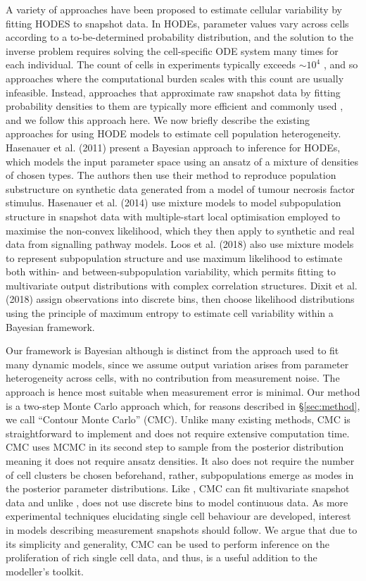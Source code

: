 A variety of approaches have been proposed to estimate cellular variability by fitting HODES to snapshot data. In HODEs, parameter values vary across cells according to a to-be-determined probability distribution, and the solution to the inverse problem requires solving the cell-specific ODE system many times for each individual. The count of cells in experiments typically exceeds $\sim10^4$ \cite{hasenauer2011identification}, and so approaches where the computational burden scales with this count are usually infeasible. Instead, approaches that approximate raw snapshot data by fitting probability densities to them are typically more efficient and commonly used \cite{hasenauer2011identification,hasenauer2014ode,loos2018hierarchical,dixit2018maximum}, and we follow this approach here. We now briefly describe the existing approaches for using HODE models to estimate cell population heterogeneity. Hasenauer et al. (2011) present a Bayesian approach to inference for HODEs, which models the input parameter space using an ansatz of a mixture of densities of chosen types. The authors then use their method to reproduce population substructure on synthetic data generated from a model of tumour necrosis factor stimulus. Hasenauer et al. (2014) use mixture models to model subpopulation structure in snapshot data with multiple-start local optimisation employed to maximise the non-convex likelihood, which they then apply to synthetic and real data from signalling pathway models. Loos et al. (2018) also use mixture models to represent subpopulation structure and use maximum likelihood to estimate both within- and between-subpopulation variability, which permits fitting to multivariate output distributions with complex correlation structures. Dixit et al. (2018) assign observations into discrete bins, then choose likelihood distributions using the principle of maximum entropy to estimate cell variability within a Bayesian framework.

Our framework is Bayesian although is distinct from the approach used to fit many dynamic models, since we assume output variation arises from parameter heterogeneity across cells, with no contribution from measurement noise. The approach is hence most suitable when measurement error is minimal. Our method is a two-step Monte Carlo approach which, for reasons described in \S \ref{sec:method}, we call ``Contour Monte Carlo'' (CMC). Unlike many existing methods, CMC is straightforward to implement and does not require extensive computation time. CMC uses MCMC in its second step to sample from the posterior distribution meaning it does not require ansatz densities. It also does not require the number of cell clusters be chosen beforehand, rather, subpopulations emerge as modes in the posterior parameter distributions. Like \cite{loos2018hierarchical}, CMC can fit multivariate snapshot data and unlike \cite{dixit2018maximum}, does not use discrete bins to model continuous data. As more experimental techniques elucidating single cell behaviour are developed, interest in models describing measurement snapshots should follow. We argue that due to its simplicity and generality, CMC can be used to perform inference on the proliferation of rich single cell data, and thus, is a useful addition to the modeller's toolkit.


